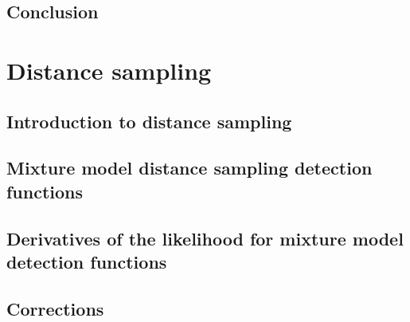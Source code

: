 \documentclass[12pt]{report}
\begin{document}


\chapter{Conclusion}


\part{Distance sampling}

\chapter{Introduction to distance sampling}



\chapter{Mixture model distance sampling detection functions}



\appendix

%
%
%

\chapter{Derivatives of the likelihood for mixture model detection functions}







\chapter*{Corrections}

\end{document}
